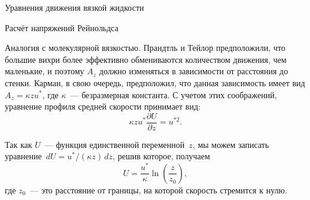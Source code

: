 \begin{chapter}{Уравнения движения вязкой жидкости}
\begin{section}{Расчёт напряжений Рейнольдса}
\begin{paragraph}{Аналогия с молекулярной вязкостью.}
Прандтль и Тейлор предположили, что большие вихри более эффективно 
обмениваются количеством движения,
чем маленькие, и поэтому $A_z$ должно изменяться в зависимости от
расстояния до стенки. Карман, в свою очередь, предположил, что данная 
зависимость имеет вид $A_z = \kappa z u^*$, где $\kappa$~--- безразмерная 
константа. С учетом этих соображений, уравнение профиля средней скорости 
принимает вид:
\begin{equation}
\kappa z u^* \frac{\partial U}{\partial z} = u^{*2}.
\end{equation}
%

Так как $U$~--- функция единственной переменной~$z$, мы можем 
записать уравнение~$dU = u^*/(\kappa z) \, dz$, решив которое, получаем
\begin{equation}\label{eq:8.20}
U = \frac{u^*}{\kappa} \ln \left(\frac{z}{z_0}\right),
\end{equation}
где $z_0$~--- это расстояние от границы, на которой скорость стремится к
нулю. 
%


\end{paragraph}
\end{section}
\end{chapter}
